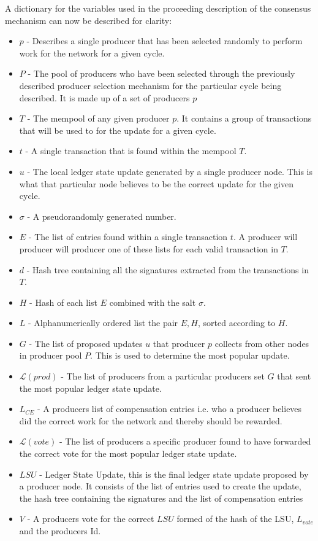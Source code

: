 A dictionary for the variables used in the proceeding description of the consensus mechanism can now be described for clarity:

\begin{itemize}

\item $p$ - Describes a single producer that has been selected randomly to perform work for the network for a given cycle. 
\item $P$ - The pool of producers who have been selected through the previously described producer selection mechanism for the particular cycle being described. It is made up of a set of producers $p$
\item $T$ - The mempool of any given producer $p$. It contains a group of transactions that will be used to for the update for a given cycle. 
\item $t$ - A single transaction that is found within the mempool $T$. 
\item $u$ - The local ledger state update generated by a single producer node. This is what that particular node believes to be the correct update for the given cycle. 
\item $\sigma$ - A pseudorandomly generated number. 
\item $E$ - The list of entries found within a single transaction $t$. A producer will producer  will producer one of these lists for each valid transaction in $T$.
\item $d$ - Hash tree containing all the signatures extracted from the transactions in $T$.
\item $H$ - Hash of each list $E$ combined with the salt $\sigma$.
\item $L$ - Alphanumerically ordered list the pair $E,H$, sorted according to $H$. 
\item $G$ - The list of proposed updates $u$ that producer $p$ collects from other nodes in producer pool $P$. This is used to determine the most popular update. 
\item $\mathcal{L}(prod)$ - The list of producers from a particular producers set $G$ that sent the most popular ledger state update.
\item $L_{CE}$ - A producers list of compensation entries i.e. who a producer believes did the correct work for the network and thereby should be rewarded. 
\item $\mathcal{L}(vote)$ - The list of producers a specific producer found to have forwarded the correct vote for the most popular ledger state update. 
\item $LSU$ - Ledger State Update, this is the final ledger state update proposed by a producer node. It consists of the list of entries used to create the update, the hash tree containing the signatures and the list of compensation entries
\item $V$ - A producers vote for the correct $LSU$ formed of the hash of the LSU, $L_{vote}$ and the producers Id.
\end{itemize}